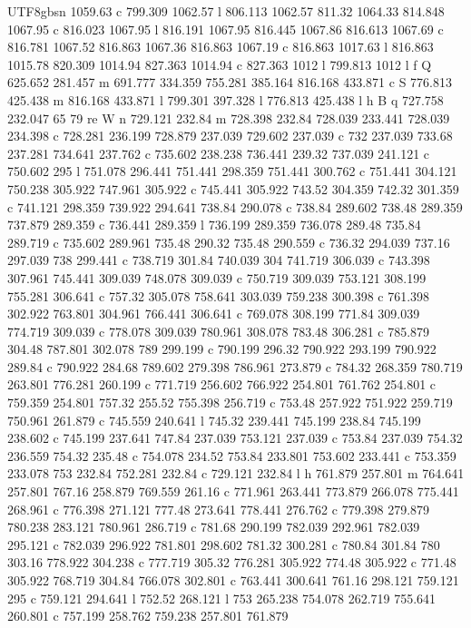 \documentclass[11pt,a4paper,oneside]{report}
\begin{document}
\begin{CJK*}{UTF8}{gbsn}
{1059.63 c 799.309 1062.57 l 806.113 1062.57 811.32 1064.33 814.848 1067.95 c 816.023 1067.95 l 816.191
1067.95 816.445 1067.86 816.613 1067.69 c 816.781 1067.52 816.863 1067.36 816.863 1067.19 c 816.863
1017.63 l 816.863 1015.78 820.309 1014.94 827.363 1014.94 c 827.363 1012 l 799.813 1012 l f Q 625.652
281.457 m 691.777 334.359 755.281 385.164 816.168 433.871 c S 776.813 425.438 m 816.168 433.871 l 799.301
397.328 l 776.813 425.438 l h B q 727.758 232.047 65 79 re W n 729.121 232.84 m 728.398 232.84 728.039
233.441 728.039 234.398 c 728.281 236.199 728.879 237.039 729.602 237.039 c 732 237.039 733.68 237.281
734.641 237.762 c 735.602 238.238 736.441 239.32 737.039 241.121 c 750.602 295 l 751.078 296.441 751.441
298.359 751.441 300.762 c 751.441 304.121 750.238 305.922 747.961 305.922 c 745.441 305.922 743.52
304.359 742.32 301.359 c 741.121 298.359 739.922 294.641 738.84 290.078 c 738.84 289.602 738.48 289.359
737.879 289.359 c 736.441 289.359 l 736.199 289.359 736.078 289.48 735.84 289.719 c 735.602 289.961
735.48 290.32 735.48 290.559 c 736.32 294.039 737.16 297.039 738 299.441 c 738.719 301.84 740.039 304
741.719 306.039 c 743.398 307.961 745.441 309.039 748.078 309.039 c 750.719 309.039 753.121 308.199
755.281 306.641 c 757.32 305.078 758.641 303.039 759.238 300.398 c 761.398 302.922 763.801 304.961
766.441 306.641 c 769.078 308.199 771.84 309.039 774.719 309.039 c 778.078 309.039 780.961 308.078 783.48
306.281 c 785.879 304.48 787.801 302.078 789 299.199 c 790.199 296.32 790.922 293.199 790.922 289.84 c
790.922 284.68 789.602 279.398 786.961 273.879 c 784.32 268.359 780.719 263.801 776.281 260.199 c 771.719
256.602 766.922 254.801 761.762 254.801 c 759.359 254.801 757.32 255.52 755.398 256.719 c 753.48 257.922
751.922 259.719 750.961 261.879 c 745.559 240.641 l 745.32 239.441 745.199 238.84 745.199 238.602 c
745.199 237.641 747.84 237.039 753.121 237.039 c 753.84 237.039 754.32 236.559 754.32 235.48 c 754.078
234.52 753.84 233.801 753.602 233.441 c 753.359 233.078 753 232.84 752.281 232.84 c 729.121 232.84 l h
761.879 257.801 m 764.641 257.801 767.16 258.879 769.559 261.16 c 771.961 263.441 773.879 266.078 775.441
268.961 c 776.398 271.121 777.48 273.641 778.441 276.762 c 779.398 279.879 780.238 283.121 780.961
286.719 c 781.68 290.199 782.039 292.961 782.039 295.121 c 782.039 296.922 781.801 298.602 781.32 300.281
c 780.84 301.84 780 303.16 778.922 304.238 c 777.719 305.32 776.281 305.922 774.48 305.922 c 771.48
305.922 768.719 304.84 766.078 302.801 c 763.441 300.641 761.16 298.121 759.121 295 c 759.121 294.641 l
752.52 268.121 l 753 265.238 754.078 262.719 755.641 260.801 c 757.199 258.762 759.238 257.801 761.879
}
\end{CJK*}
\end{document}
